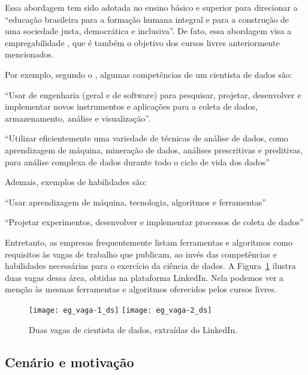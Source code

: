 Essa abordagem tem sido adotada no ensino básico \cite{Avila2017} e superior para direcionar a ``educação brasileira para a formação humana integral e para a construção de uma sociedade justa, democrática e inclusiva''.
De fato, essa abordagem visa a empregabilidade \cite{Voorhees2001}, que é também o objetivo dos cursos livres anteriormente mencionados.

Por exemplo, segundo o  \cite{CF-DS-Release2019}, algumas competências de um cientista de dados são:
\begin{compactitem}
	\item ``Usar de engenharia (geral e de software) para pesquisar, projetar, desenvolver e implementar novos instrumentos e aplicações para a coleta de dados, armazenamento, análise e visualização''.
	\item ``Utilizar eficientemente uma variedade de técnicas de análise de dados, como aprendizagem de máquina, mineração de dados, análises prescritivas e preditivas, para análise complexa de dados durante todo o ciclo de vida dos dados''
\end{compactitem}
Ademais, exemplos de habilidades são:
\begin{compactitem}
	\item ``Usar aprendizagem de máquina, tecnologia, algoritmos e ferramentas''
	\item ``Projetar experimentos, desenvolver e implementar processos de coleta de dados''
\end{compactitem}

Entretanto, as empresas frequentemente listam ferramentas e algoritmos como requisitos às vagas de trabalho que publicam, ao invés das competências e habilidades necessárias para o exercício da ciência de dados.
A Figura~\ref{fig:vagas} ilustra duas vagas dessa área, obtidas na plataforma LinkedIn.
Nela podemos ver a menção às mesmas ferramentas e algoritmos oferecidos pelos cursos livres.

\begin{figure}
	\texttt{[image: eg\_vaga-1\_ds]}\hfill
	\texttt{[image: eg\_vaga-2\_ds]}
	\caption{Duas vagas de cientista de dados, extraídas do LinkedIn.}
	\label{fig:vagas}
\end{figure}

\subsection{Cenário e motivação}\label{sec:motivação}

